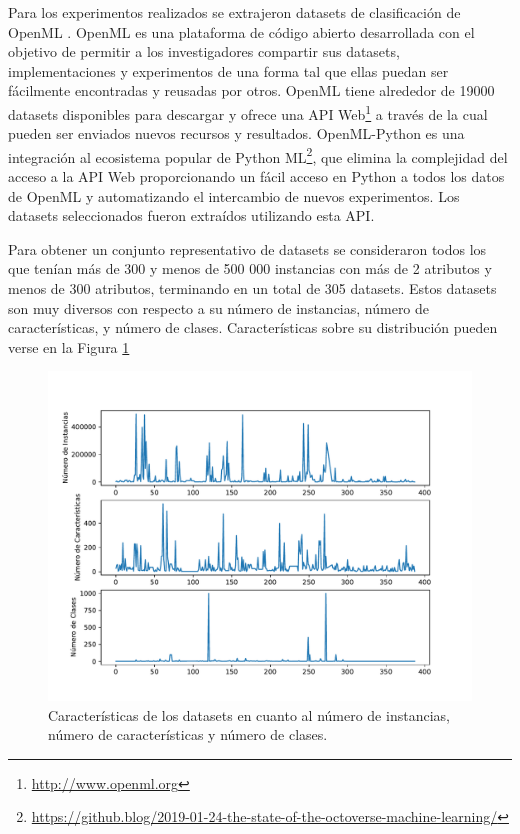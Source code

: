 Para los experimentos realizados se extrajeron datasets de clasificación de OpenML \cite{vanschoren2014openml}. OpenML es una plataforma de código abierto desarrollada con el objetivo de permitir a los investigadores compartir sus datasets, implementaciones y experimentos de una forma tal que ellas puedan ser fácilmente encontradas y reusadas por otros. OpenML tiene alrededor de 19000 datasets disponibles para descargar y ofrece una API Web\footnote{\url{http://www.openml.org}} a través de la cual pueden ser enviados nuevos recursos y resultados. OpenML-Python \cite{feurer2019openmlpy} es una integración al ecosistema popular de Python ML\footnote{\url{https://github.blog/2019-01-24-the-state-of-the-octoverse-machine-learning/}}, que elimina la complejidad del acceso a la API Web proporcionando un fácil acceso en Python a todos los datos de OpenML y automatizando el intercambio de nuevos experimentos. Los datasets seleccionados fueron extraídos utilizando esta API.
 
 Para obtener un conjunto representativo de datasets se consideraron todos los que tenían más de 300  y menos de 500 000 instancias con más de 2 atributos y menos de 300 atributos, terminando en un total de 305 datasets. Estos datasets son muy diversos con respecto a su número de instancias, número de características, y número de clases. Características sobre su distribución pueden verse en la Figura \ref{fig:datasets}
 
 \begin{figure}[H]
\centering
\includegraphics[scale=.75]{Figures/mtf-lineplot.pdf}
\caption{Características de los datasets en cuanto al número de instancias, número de características y número de clases.}
\label{fig:datasets}
\end{figure}
 
